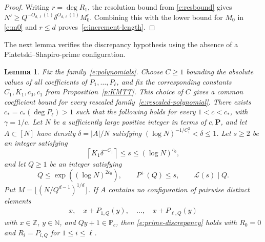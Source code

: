\documentclass[12pt]{amsart}
\newcommand{\N}{\mathbb N}
\newcommand{\Z}{\mathbb Z}
\newcommand{\1}{\mathbf 1}
\newtheorem{lemma}[theorem]{Lemma}
\begin{document}
\begin{proof}
Writing $r=\deg R_1$, the resolution bound from \eqref{e:resbound} gives
$N'\geq Q^{-O_{d,\ell}(1)}\delta^{O_{d,\ell}(1)}M_0^r$.
Combining this with the lower bound for $M_0$ in \eqref{e:m0} and $r\leq d$
proves~\eqref{e:increment-length}.
\end{proof}


The next lemma verifies the discrepancy hypothesis using the absence of
a Piatetski--Shapiro-prime configuration.

\begin{lemma}
\label{l:PS-discrepancy}
Fix the family~\eqref{e:polynomials}.
Choose $C\geq1$ bounding the absolute values of all coefficients
of $P_1,\ldots,P_\ell$, and fix the corresponding constants
$C_1,K_1,c_0,c_1$ from Proposition~\ref{p:KMTT}.
This choice of $C$ gives a common coefficient bound for every
rescaled family~\eqref{e:rescaled-polynomial}.
There exists $c_*=c_*(\deg P_{\ell})>1$ such that the following holds for every
$1<c<c_*$, with $\gamma=1/c$. Let $N$ be a sufficiently large
positive integer in terms of $c,\mathbf P$, and let
$A\subset[N]$ have density $\delta=|A|/N$ satisfying
$(\log N)^{-1/C_1^2}<\delta\leq1$.
Let $s\geq2$ be an integer satisfying
\[
 \left\lceil K_1\delta^{-C_1}\right\rceil
 \leq s\leq(\log N)^{c_0},
\]
and let $Q\geq1$ be an integer satisfying
\[
 Q\leq\exp((\log N)^{2c_0}),\qquad
 P^+(Q)\leq s,\qquad \mathcal L(s)\mid Q.
\]
Put $M=\lfloor(N/Q^{d-1})^{1/d}\rfloor$.
If $A$ contains no configuration of pairwise distinct elements
\begin{align}\label{e:forbidencond}
     x,\quad x+P_{1,Q}(y),\quad\ldots,\quad x+P_{\ell,Q}(y)
\end{align}
with $x\in\Z$, $y\in\N$, and $Qy+1\in\mathbb P_c$, then
\eqref{e:prime-discrepancy} holds with $R_0=0$ and
$R_i=P_{i,Q}$ for $1\leq i\leq\ell$.
\end{lemma}
\end{document}
